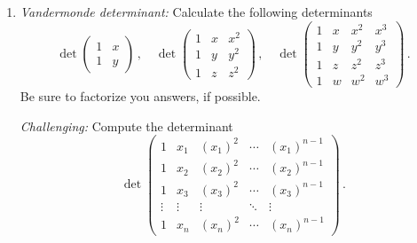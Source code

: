 \begin{enumerate}
\item
{\itshape Vandermonde determinant:} Calculate the following determinants
\[
\det \begin{pmatrix}1 & x\\ 1 & y\end{pmatrix}\, ,\quad
\det \begin{pmatrix}1 & x & x^2\\ 1 & y&y^2\\ 1& z&z^2\end{pmatrix}\, ,\quad
\det \begin{pmatrix}1 & x & x^2 & x^3\\ 1 & y& y^2 & y^3\\ 1 & z & z^2 & z^3\\ 1 & w & w^2 & w^3\end{pmatrix}\, .
\]
Be sure to factorize you answers, if possible.

{\itshape Challenging:} Compute the determinant
\[
\det \begin{pmatrix}1 & x_1 & (x_1)^2 & \cdots &(x_1)^{n-1}\\ 
1 & x_2& (x_2)^2 & \cdots &  (x_2)^{n-1}\\ 
1 & x_3& (x_3)^2 & \cdots &  (x_3)^{n-1}\\ 
\vdots &\vdots &\vdots &\ddots & \vdots\ \ \  \\ 
1 & x_n& (x_n)^2 & \cdots &  (x_n)^{n-1}\end{pmatrix}\, .
\]


\end{enumerate}
